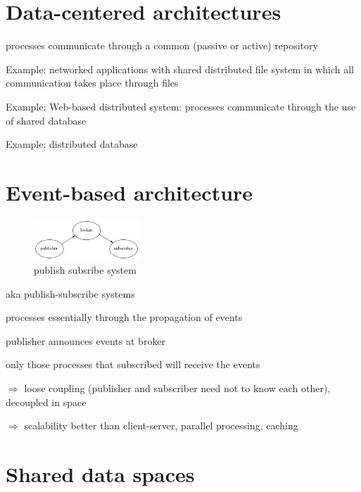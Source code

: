\documentclass[ngerman,a4paper]{report}
\begin{document}
\section{Data-centered architectures}

\begin{compactitem}
	\item processes communicate through a common (passive or active) repository
	\item Example: networked applications with shared distributed file system in which all communication takes place through files
	\item Example: Web-based distributed system: processes communicate through the use of shared database
	\item Example: distributed database
\end{compactitem}

\section{Event-based architecture}

\begin{figure}[h]
	\centering
	\includegraphics[width=150px]{gfx/pub_sub.png}
	\caption{publish subsribe system}
	\label{img:publish_subscribe}
\end{figure}

\begin{compactitem}
	\item aka publish-subscribe systems
	\item processes essentially through the propagation of events
	\item publisher announces events at broker
	\item only those processes that subscribed will receive the events
	\item $\Rightarrow$ loose coupling (publisher and subscriber need not to know each other), decoupled in space\\
	\item $\Rightarrow$ scalability better than client-server, parallel processing, caching\\
\end{compactitem}

\section{Shared data spaces}
\end{document}
